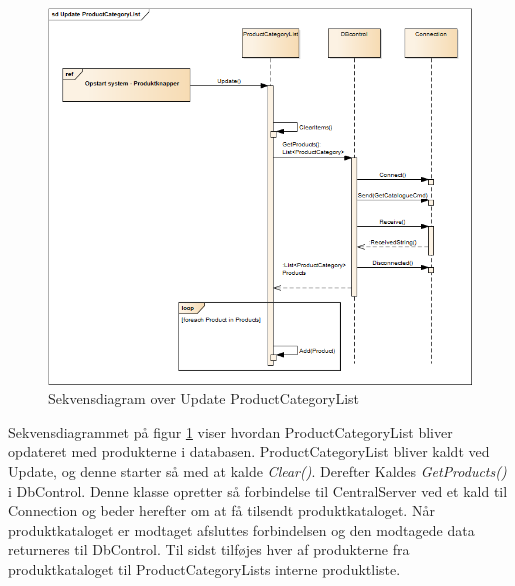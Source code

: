 \begin{figure}[H]
	\centering
	\includegraphics[width=1\textwidth]{Systemdesign/Frontend/GUI/DesignOgStruktur/Pics/UpdateProductCategoryList}
	\caption{Sekvensdiagram over Update ProductCategoryList}
	\label{fig:SekvensUpdatePCL}
\end{figure}

Sekvensdiagrammet på figur \ref{fig:SekvensUpdatePCL} viser hvordan ProductCategoryList bliver opdateret med produkterne i databasen. ProductCategoryList bliver kaldt ved Update, og denne starter så med at kalde \textit{Clear()}. Derefter Kaldes \textit{GetProducts()} i DbControl. Denne klasse opretter så forbindelse til CentralServer ved et kald til Connection og beder herefter om at få tilsendt produktkataloget. Når produktkataloget er modtaget afsluttes forbindelsen og den modtagede data returneres til DbControl. Til sidst tilføjes hver af produkterne fra produktkataloget til ProductCategoryLists interne produktliste.

